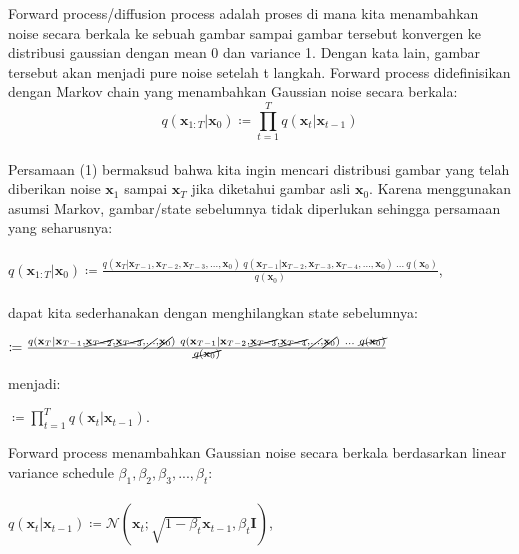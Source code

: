 \documentclass{article}
\begin{document}
Forward process/diffusion process adalah proses di mana kita menambahkan noise secara berkala ke sebuah gambar sampai gambar tersebut konvergen ke distribusi gaussian dengan mean 0 dan variance 1. Dengan kata lain, gambar tersebut akan menjadi pure noise setelah t langkah. Forward process didefinisikan dengan Markov chain yang menambahkan Gaussian noise secara berkala:
\\
\begin{equation}
q(\textbf{x}_{1:T}|\textbf{x}_{0}) \coloneq \displaystyle \prod_{t=1}^{T} q(\textbf{x}_{t}|\textbf{x}_{t-1})
\end{equation}
\\
Persamaan (1) bermaksud bahwa kita ingin mencari distribusi gambar yang telah diberikan noise $ \textbf{x}_{1} $ sampai $ \textbf{x}_{T} $ jika diketahui gambar asli $ \textbf{x}_{0} $. Karena menggunakan asumsi Markov, gambar/state sebelumnya tidak diperlukan sehingga persamaan yang seharusnya:
\\\\
$ q(\textbf{x}_{1:T}|\textbf{x}_{0}) \coloneq  \frac{q(\textbf{x}_{T}|\textbf{x}_{T-1},\textbf{x}_{T-2},\textbf{x}_{T-3},...,\textbf{x}_{0}) \ q(\textbf{x}_{T-1}|\textbf{x}_{T-2},\textbf{x}_{T-3},\textbf{x}_{T-4},...,\textbf{x}_{0}) \ ... \ q(\textbf{x}_{0})  } {  q(\textbf{x}_{0}) } $,
\\\\
dapat kita sederhanakan dengan menghilangkan state sebelumnya:
\begin{tabbing} 
\hspace{4.75em} $ \coloneq \frac{q(\textbf{x}_{T}|\textbf{x}_{T-1},\cancel{\textbf{x}_{T-2}},\cancel{\textbf{x}_{T-3}},\cancel{...},\cancel{\textbf{x}_{0}}) \ q(\textbf{x}_{T-1}|\textbf{x}_{T-2},\cancel{\textbf{x}_{T-3}},\cancel{\textbf{x}_{T-4}},\cancel{...},\cancel{\textbf{x}_{0}}) \ ... \ \cancel{ q(\textbf{x}_{0}) } } {  \cancel{ q(\textbf{x}_{0}) } } $ 
\end{tabbing}
menjadi:
\begin{tabbing} 
\hspace{4.75em} $ \coloneq \displaystyle \prod_{t=1}^{T} q(\textbf{x}_{t}|\textbf{x}_{t-1}) $.
\end{tabbing}
Forward process menambahkan Gaussian noise secara berkala berdasarkan linear variance schedule $ \beta_1, \beta_2, \beta_3, ..., \beta_t $:
\\\\
$  q(\textbf{x}_{t}|\textbf{x}_{t-1}) \coloneq \mathscr{N}(\textbf{x}_{t};\sqrt{1-\beta_t}\textbf{x}_{t-1},\beta_t \textbf{I}) $,
\end{document}
